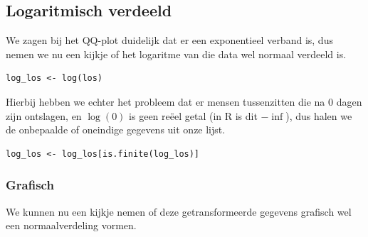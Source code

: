 \documentclass{article}
\begin{document}
\subsection{Logaritmisch verdeeld}
We zagen bij het QQ-plot duidelijk dat er een exponentieel verband is, dus nemen we nu een kijkje of het logaritme van die data wel normaal verdeeld is. 

\begin{verbatim}
log_los <- log(los)
\end{verbatim}

Hierbij hebben we echter het probleem dat er mensen tussenzitten die na 0 dagen zijn ontslagen, en $\log(0)$ is geen re\"eel getal (in R is dit $-\inf$), dus halen we de onbepaalde of oneindige gegevens uit onze lijst.

\begin{verbatim}
log_los <- log_los[is.finite(log_los)]
\end{verbatim}

\subsubsection{Grafisch}
We kunnen nu een kijkje nemen of deze getransformeerde gegevens grafisch wel een normaalverdeling vormen.  
\end{document}
